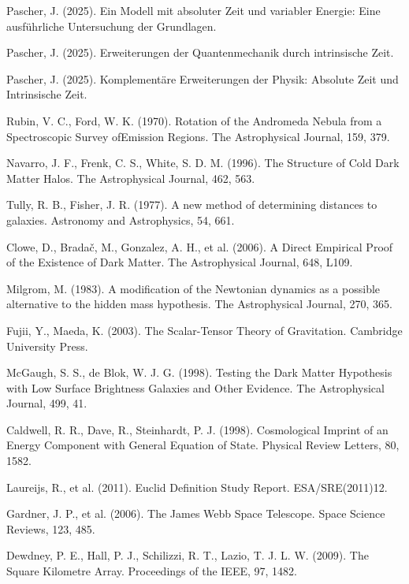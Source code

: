 \documentclass[a4paper,12pt]{article}
\begin{document}
	\begin{thebibliography}{99}
		
		 Pascher, J. (2025). Ein Modell mit absoluter Zeit und variabler Energie: Eine ausführliche Untersuchung der Grundlagen.
		
		 Pascher, J. (2025). Erweiterungen der Quantenmechanik durch intrinsische Zeit.
		
		 Pascher, J. (2025). Komplementäre Erweiterungen der Physik: Absolute Zeit und Intrinsische Zeit.
		
		 Rubin, V. C., Ford, W. K. (1970). Rotation of the Andromeda Nebula from a Spectroscopic Survey ofEmission Regions. The Astrophysical Journal, 159, 379.
		
		 Navarro, J. F., Frenk, C. S., White, S. D. M. (1996). The Structure of Cold Dark Matter Halos. The Astrophysical Journal, 462, 563.
		
		 Tully, R. B., Fisher, J. R. (1977). A new method of determining distances to galaxies. Astronomy and Astrophysics, 54, 661.
		
		 Clowe, D., Bradač, M., Gonzalez, A. H., et al. (2006). A Direct Empirical Proof of the Existence of Dark Matter. The Astrophysical Journal, 648, L109.
		
		 Milgrom, M. (1983). A modification of the Newtonian dynamics as a possible alternative to the hidden mass hypothesis. The Astrophysical Journal, 270, 365.
		
		 Fujii, Y., Maeda, K. (2003). The Scalar-Tensor Theory of Gravitation. Cambridge University Press.
		
		 McGaugh, S. S., de Blok, W. J. G. (1998). Testing the Dark Matter Hypothesis with Low Surface Brightness Galaxies and Other Evidence. The Astrophysical Journal, 499, 41.
		
		 Caldwell, R. R., Dave, R., Steinhardt, P. J. (1998). Cosmological Imprint of an Energy Component with General Equation of State. Physical Review Letters, 80, 1582.
		
		 Laureijs, R., et al. (2011). Euclid Definition Study Report. ESA/SRE(2011)12.
		
		 Gardner, J. P., et al. (2006). The James Webb Space Telescope. Space Science Reviews, 123, 485.
		
		 Dewdney, P. E., Hall, P. J., Schilizzi, R. T., Lazio, T. J. L. W. (2009). The Square Kilometre Array. Proceedings of the IEEE, 97, 1482.
		
	\end{thebibliography}
	
\end{document}
